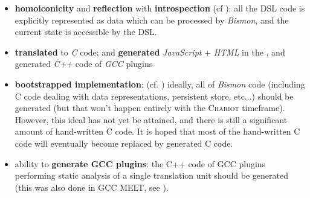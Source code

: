 \begin{itemize}
  \item \textbf{homoiconicity} and \textbf{reflection} with
    \textbf{introspection} (cf \cite{Pitrat:1996:FGCS,
      Pitrat:1990:Metaconnaissances, Pitrat:2009:AST,
      Pitrat:2009:ArtifBeings}): all the DSL code is explicitly
    represented as data which can be processed by \textit{Bismon}, and
    the current state is accessible by the DSL.

    \item \textbf{translated} to \emph{C} code; and \textbf{generated}
      \emph{JavaScript} + \emph{HTML} in the , and generated
      \emph{C++} code of \emph{GCC} plugins 

    \item \textbf{bootstrapped implementation}:  (cf. \cite{Pitrat:1996:FGCS, Polito:2014:Bootstrapping-pharo})
      ideally, all of \textit{Bismon} code (including C code dealing
      with data representations, persistent store, etc...) should be
      generated (but that won't happen entirely with the
      \textsc{Chariot} timeframe). However, this ideal has not yet be
      attained, and there is still a significant amount of
      hand-written C code. It is hoped that most of the hand-written C
      code will eventually become replaced by generated C code.
      
    \item ability to \textbf{generate GCC plugins}: the C++ code of
      GCC plugins  performing static analysis of a single translation
      unit should be generated (this was also done in GCC MELT, see \cite{Starynkevitch-DSL2011}).


\end{itemize}
